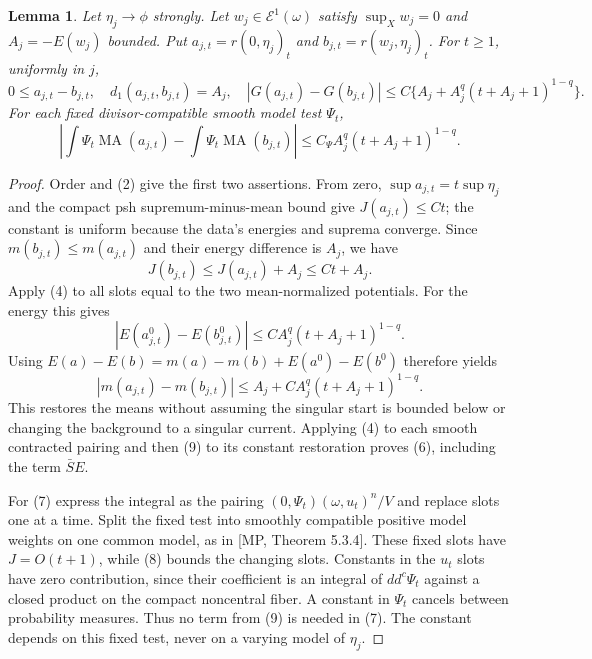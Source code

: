 \documentclass[11pt]{article}
\newcommand{\MA}{\operatorname{MA}}
\newcommand{\Eone}{\mathcal E^1}
\newtheorem{lemma}[theorem]{Lemma}
\begin{document}
\begin{lemma}
Let $\eta_j\to\phi$ strongly. Let $w_j\in\Eone(\omega)$ satisfy
$\sup_Xw_j=0$ and $A_j=-E(w_j)$ bounded. Put
$a_{j,t}=r(0,\eta_j)_t$ and $b_{j,t}=r(w_j,\eta_j)_t$.
For $t\geq1$, uniformly in $j$,
\[
 0\leq a_{j,t}-b_{j,t},\quad d_1(a_{j,t},b_{j,t})=A_j,
 \quad
 |G(a_{j,t})-G(b_{j,t})|
 \leq C\{A_j+A_j^q(t+A_j+1)^{1-q}\}.                   \tag{6}
\]
For each fixed divisor-compatible smooth model test $\Psi_t$,
\[
 \left|\int\Psi_t\MA(a_{j,t})-\int\Psi_t\MA(b_{j,t})\right|
 \leq C_\Psi A_j^q(t+A_j+1)^{1-q}.                      \tag{7}
\]
\end{lemma}
\begin{proof}
Order and (2) give the first two assertions. From zero,
$\sup a_{j,t}=t\sup\eta_j$ and the compact psh
supremum-minus-mean bound give $J(a_{j,t})\leq Ct$;
the constant is uniform because the data's energies and suprema
converge. Since $m(b_{j,t})\leq m(a_{j,t})$ and their energy difference
is $A_j$, we have
\[
 J(b_{j,t})\leq J(a_{j,t})+A_j\leq Ct+A_j.               \tag{8}
\]
Apply (4) to all slots equal to the two mean-normalized potentials.
For the energy this gives
\[
 |E(a_{j,t}^0)-E(b_{j,t}^0)|
 \leq C A_j^q(t+A_j+1)^{1-q}.
\]
Using $E(a)-E(b)=m(a)-m(b)+E(a^0)-E(b^0)$ therefore yields
\[
 |m(a_{j,t})-m(b_{j,t})|
 \leq A_j+C A_j^q(t+A_j+1)^{1-q}.                       \tag{9}
\]
This restores the means without assuming the singular start is bounded
below or changing the background to a singular current. Applying (4)
to each smooth contracted pairing and then (9) to its constant
restoration proves (6), including the term $\bar S E$.

For (7) express the integral as the pairing
$(0,\Psi_t)(\omega,u_t)^n/V$ and replace slots one at a time.
Split the fixed test into smoothly compatible positive model weights
on one common model, as in [MP, Theorem 5.3.4]. These fixed slots have
$J=O(t+1)$, while (8) bounds the changing slots. Constants in the
$u_t$ slots have zero contribution, since their coefficient is an
integral of $dd^c\Psi_t$ against a closed product on the compact
noncentral fiber. A constant in $\Psi_t$ cancels between probability
measures. Thus no term from (9) is needed in (7). The constant depends
on this fixed test, never on a varying model of $\eta_j$.
\end{proof}
\end{document}
